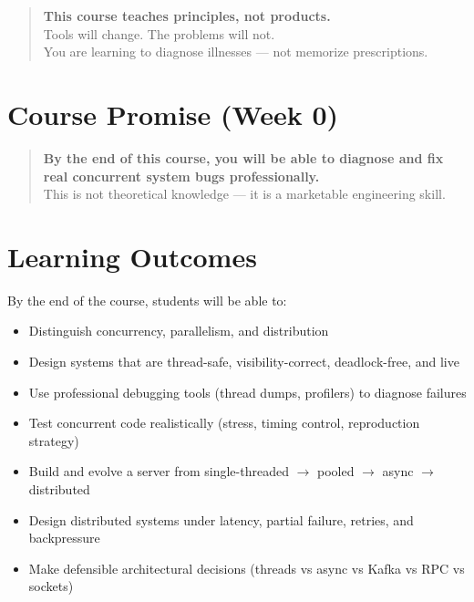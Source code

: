 \documentclass[11pt,a4paper]{article}
\begin{document}
	\begin{quote}
		\textbf{This course teaches principles, not products.}\\
		Tools will change. The problems will not.\\
		You are learning to diagnose illnesses --- not memorize prescriptions.
	\end{quote}
	
	\section*{Course Promise (Week 0)}
	
	\begin{quote}
		\textbf{By the end of this course, you will be able to diagnose and fix real concurrent system bugs professionally.}\\
		This is not theoretical knowledge --- it is a marketable engineering skill.
	\end{quote}
	
	\section*{Learning Outcomes}
	
	By the end of the course, students will be able to:
	
	\begin{itemize}[leftmargin=*]
		\item Distinguish concurrency, parallelism, and distribution
		\item Design systems that are thread-safe, visibility-correct, deadlock-free, and live
		\item Use professional debugging tools (thread dumps, profilers) to diagnose failures
		\item Test concurrent code realistically (stress, timing control, reproduction strategy)
		\item Build and evolve a server from single-threaded $\rightarrow$ pooled $\rightarrow$ async $\rightarrow$ distributed
		\item Design distributed systems under latency, partial failure, retries, and backpressure
		\item Make defensible architectural decisions (threads vs async vs Kafka vs RPC vs sockets)
	\end{itemize}
	
\end{document}
